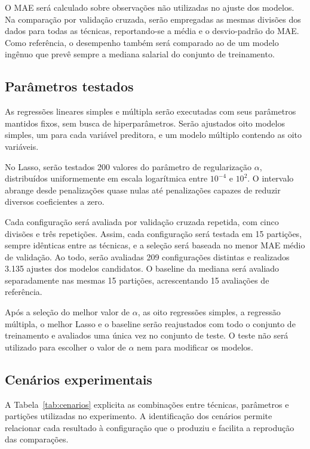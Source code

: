 O MAE será calculado sobre observações não utilizadas no ajuste dos modelos. Na comparação por validação cruzada, serão empregadas as mesmas divisões dos dados para todas as técnicas, reportando-se a média e o desvio-padrão do MAE. Como referência, o desempenho também será comparado ao de um modelo ingênuo que prevê sempre a mediana salarial do conjunto de treinamento.

\subsection{Parâmetros testados}

As regressões lineares simples e múltipla serão executadas com seus parâmetros mantidos fixos, sem busca de hiperparâmetros. Serão ajustados oito modelos simples, um para cada variável preditora, e um modelo múltiplo contendo as oito variáveis.

No Lasso, serão testados 200 valores do parâmetro de regularização $\alpha$, distribuídos uniformemente em escala logarítmica entre $10^{-4}$ e $10^{2}$. O intervalo abrange desde penalizações quase nulas até penalizações capazes de reduzir diversos coeficientes a zero.

Cada configuração será avaliada por validação cruzada repetida, com cinco divisões e três repetições. Assim, cada configuração será testada em 15 partições, sempre idênticas entre as técnicas, e a seleção será baseada no menor MAE médio de validação. Ao todo, serão avaliadas 209 configurações distintas e realizados 3.135 ajustes dos modelos candidatos. O baseline da mediana será avaliado separadamente nas mesmas 15 partições, acrescentando 15 avaliações de referência.

Após a seleção do melhor valor de $\alpha$, as oito regressões simples, a regressão múltipla, o melhor Lasso e o baseline serão reajustados com todo o conjunto de treinamento e avaliados uma única vez no conjunto de teste. O teste não será utilizado para escolher o valor de $\alpha$ nem para modificar os modelos.

\subsection{Cenários experimentais}

A Tabela~\ref{tab:cenarios} explicita as combinações entre técnicas, parâmetros e partições utilizadas no experimento. A identificação dos cenários permite relacionar cada resultado à configuração que o produziu e facilita a reprodução das comparações.

